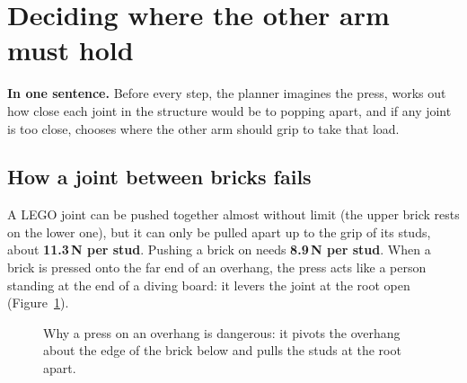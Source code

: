 \documentclass[11pt,a4paper]{article}
\newcommand{\keyidea}[1]{\par\smallskip\noindent\colorbox{keyc}{\parbox{\dimexpr\linewidth-2\fboxsep}{\small\textbf{In one sentence.} #1}}\par\smallskip}
\begin{document}
\section{Deciding where the other arm must hold}\label{sec:support}

\keyidea{Before every step, the planner imagines the press, works out how close each
joint in the structure would be to popping apart, and if any joint is too
close, chooses where the other arm should grip to take that load.}

\subsection{How a joint between bricks fails}
A LEGO joint can be pushed together almost without limit (the upper brick rests
on the lower one), but it can only be pulled apart up to the grip of its studs,
about \textbf{11.3\,N per stud}. Pushing a brick on needs \textbf{8.9\,N per stud}.
When a brick is pressed onto the far end of an overhang, the press acts like a
person standing at the end of a diving board: it levers the joint at the root
open (Figure~\ref{fig:lever}).

\begin{figure}[H]
\centering
{}
\caption{Why a press on an overhang is dangerous: it pivots the overhang about the
edge of the brick below and pulls the studs at the root apart.}
\label{fig:lever}
\end{figure}
\end{document}
